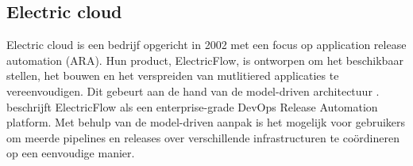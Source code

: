 %
\subsection{Electric cloud}
Electric cloud is een bedrijf opgericht in 2002 met een focus op application release automation (ARA).
Hun product, ElectricFlow, is ontworpen om het beschikbaar stellen, het bouwen en het verspreiden van mutlitiered applicaties te vereenvoudigen.
Dit gebeurt aan de hand van de model-driven architectuur \citep{gartner}.
\citet{electricflow} beschrijft ElectricFlow als een enterprise-grade DevOps Release Automation platform.
Met behulp van de model-driven aanpak is het mogelijk voor gebruikers om meerde pipelines en releases over verschillende infrastructuren te coördineren op een eenvoudige manier.

